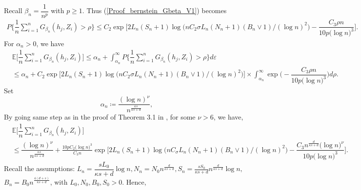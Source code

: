 \documentclass[10pt,twoside]{article}
\numberwithin{equation}{section}
\newcommand{\E}{\ensuremath{\mathbb{E}}}
\begin{document}
%
Recall $\beta_n = \dfrac{1}{n^p}$ with $p \ge 1$. Thus (\ref{Proof_bernstein_Gbeta_V1}) becomes
%
\begin{align}\label{Proof_bernstein_Gbeta_V2}
\nonumber P \Big\{\dfrac{1}{n} \sum_{i = 1}^n G_{\beta_n}(h_{j}, Z_i) > \rho \Big\} \leq C_2 \exp \Bigg[2L_n(S_n + 1)\log\Big(n C_2{\sigma}L_n(N_n + 1)(B_n \lor 1)/ (\log n)^2\Big) - \dfrac{C_3 \rho n}{10 p \big(\log n\big)^3} \Bigg]. 
\end{align}
%
For $\alpha_n > 0$, we have
%
\begin{align}
\nonumber  &\E\Big[\dfrac{1}{n}\sum_{i = 1}^n G_{\beta_n}(h_{j}, Z_i) \Big]  \leq \alpha_n + \displaystyle\int_{\alpha_n}^{\infty} P\Big\{\dfrac{1}{n}\sum_{i = 1}^n G_{\beta_n}(h_{j}, Z_i) > \rho \Big\} d\varepsilon  
\\
 & \leq \alpha_n + C_2\exp \Bigg[2L_n(S_n + 1)\log\Big(n C_2{\sigma}L_n(N_n + 1)(B_n \lor 1)/ (\log n)^2\Big)  \Bigg] \times \displaystyle\int_{\alpha_n}^{\infty} \exp \Bigg( - \dfrac{C_3 \rho n}{10 p \big(\log n\big)^3} \Bigg) d\rho.    
\end{align}
%
%
% 
%
Set 
\begin{equation}\label{equa_alpha_n}
\alpha_n \coloneqq \dfrac{(\log n)^{\nu}}{ n^{\frac{\kappa s}{\kappa s + d} } },  
\end{equation} 
%
By going same step as in the proof of Theorem 3.1 in \cite{kengne2025general}, for some $\nu > 6$, we have,
%  
%
\begin{align}\label{proof_E_G_beta_log_nu_n}
\nonumber &\E\Big[ \dfrac{1}{n}\sum_{i = 1}^n G_{\beta_n}(h_{j}, Z_i) \Big] \\
& \leq \dfrac{(\log n)^{\nu}}{ n^{\frac{\kappa s}{\kappa s + d} } } + \frac{10 p C_2 \big(\log n\big)^3}{C_3 n} \exp\Bigg[2L_n(S_n + 1)\log \Big(n C_{\sigma}L_n(N_n + 1)(B_n \lor 1)/(\log n)^2 \Big) - \dfrac{C_3 n^{\frac{d}{\kappa s + d} } \big(\log n\big)^{\nu}}{10 p \big(\log n\big)^3} \Bigg].
\end{align}
%
% 
Recall the assumptions:
%
$
L_n = \dfrac{s L_0}{\kappa s + d} \log n, N_n = N_0 n^{\frac{d}{\kappa s + d}}, S_n = \frac{s S_0}{\kappa s + d} n^{\frac{d}{\kappa s + d}}\log n, 
$
%
$ B_n = B_0 n^{\frac{4(d + s)}{\kappa s + d}}$,
with $L_0, N_0, B_0, S_0 >0$. 
% 
%
Hence,
%
\end{document}
